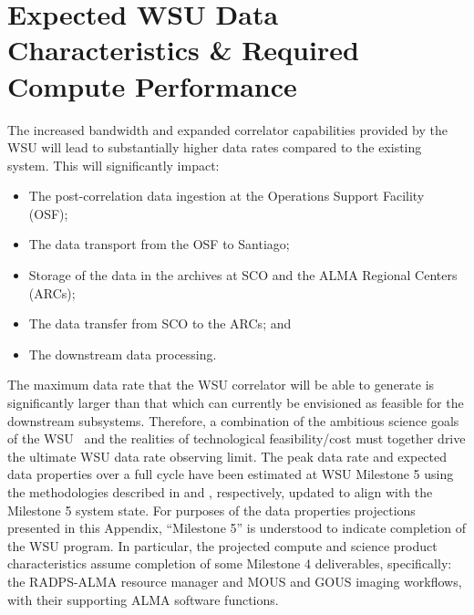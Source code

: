 \section{Expected WSU Data Characteristics \& Required Compute Performance} %
\label{sub:wsu_data_rates}





The increased bandwidth and expanded correlator capabilities provided by the WSU will lead to substantially higher data rates compared to the existing system. This will significantly impact:
\begin{itemize}[itemsep=-0.5em]
    \item The post-correlation data ingestion at the Operations Support Facility (OSF);
    \item The data transport from the OSF to Santiago;
    \item Storage of the data in the archives at SCO and the ALMA Regional Centers (ARCs);
    \item The data transfer from SCO to the ARCs; and
    \item The downstream data processing.
\end{itemize} 

The maximum data rate that the WSU correlator will be able to generate is significantly larger than that which can currently be envisioned as feasible for the downstream subsystems. Therefore, a combination of the ambitious science goals of the WSU~\cite{memo621} and the realities of technological feasibility/cost must together drive the ultimate WSU data rate observing limit. The peak data rate and expected data properties over a full cycle have been estimated at WSU Milestone 5 using the methodologies described in \cite{drru_peak} and \cite{drru_mean}, respectively, updated to align with the Milestone 5 system state.  For purposes of the data properties projections presented in this Appendix, ``Milestone 5'' is understood to indicate completion of the WSU program.  In particular, the projected compute and science product characteristics  assume completion of some Milestone 4 deliverables, specifically: the RADPS-ALMA resource manager and MOUS and GOUS imaging workflows, with their supporting ALMA software functions.


